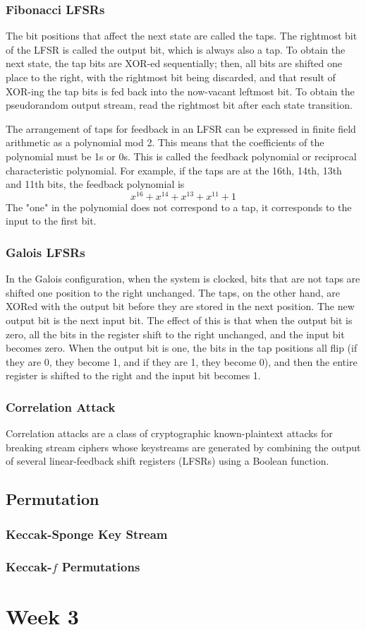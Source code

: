 \documentclass{article}
\theoremstyle{mytheoremstyle}
\begin{document}
    \subsubsection{Fibonacci LFSRs}
    The bit positions that affect the next state are called the taps. The rightmost bit of the LFSR is called the output bit, which is always also a tap. To obtain the next state, the tap bits are XOR-ed sequentially; then, all bits are shifted one place to the right, with the rightmost bit being discarded, and that result of XOR-ing the tap bits is fed back into the now-vacant leftmost bit. To obtain the pseudorandom output stream, read the rightmost bit after each state transition. 

    The arrangement of taps for feedback in an LFSR can be expressed in finite field arithmetic as a polynomial mod 2. This means that the coefficients of the polynomial must be 1s or 0s. This is called the feedback polynomial or reciprocal characteristic polynomial. For example, if the taps are at the 16th, 14th, 13th and 11th bits, the feedback polynomial is 
    \begin{equation*}
        x^{16}+x^{14}+x^{13}+x^{11}+1
    \end{equation*}
    The "one" in the polynomial does not correspond to a tap, it corresponds to the input to the first bit.
    \subsubsection{Galois LFSRs}
    In the Galois configuration, when the system is clocked, bits that are not taps are shifted one position to the right unchanged. The taps, on the other hand, are XORed with the output bit before they are stored in the next position. The new output bit is the next input bit. The effect of this is that when the output bit is zero, all the bits in the register shift to the right unchanged, and the input bit becomes zero. When the output bit is one, the bits in the tap positions all flip (if they are 0, they become 1, and if they are 1, they become 0), and then the entire register is shifted to the right and the input bit becomes 1. 
    \subsubsection{Correlation Attack}
    Correlation attacks are a class of cryptographic known-plaintext attacks for breaking stream ciphers whose keystreams are generated by combining the output of several linear-feedback shift registers (LFSRs) using a Boolean function.
    \subsection{Permutation}
    \subsubsection{Keccak-Sponge Key Stream}
    \subsubsection{Keccak-$f$ Permutations}
    
    \section{Week 3}
\end{document}
